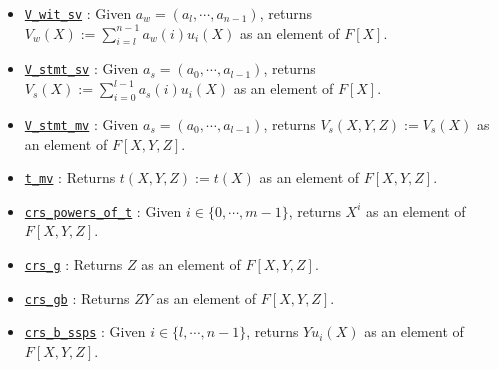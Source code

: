 \documentclass{article}
\theoremstyle{definition}
\theoremstyle{remark}
\begin{document}
\begin{itemize}
  \item \href{https://github.com/BoltonBailey/formal-snarks-project/blob/7fd9cd122f5887f88f6a706b4f2a68a7153c7381/src/snarks/babysnark/knowledge_soundness.lean#L120}{\texttt{V\_wit\_sv}} : Given $a_w = (a_l, \cdots, a_{n - 1})$, returns $V_w(X) := \sum_{i = l}^{n - 1} a_w (i) u_i (X)$ as an element of $F[X]$.
  \item \href{https://github.com/BoltonBailey/formal-snarks-project/blob/7fd9cd122f5887f88f6a706b4f2a68a7153c7381/src/snarks/babysnark/knowledge_soundness.lean#L124}{\texttt{V\_stmt\_sv}} : Given $a_s = (a_0, \cdots, a_{l - 1})$, returns $V_s(X) := \sum_{i = 0}^{l - 1} a_s (i) u_i (X)$ as an element of $F[X]$.
  \item \href{https://github.com/BoltonBailey/formal-snarks-project/blob/7fd9cd122f5887f88f6a706b4f2a68a7153c7381/src/snarks/babysnark/knowledge_soundness.lean#L153}{\texttt{V\_stmt\_mv}} : Given $a_s = (a_0, \cdots, a_{l - 1})$, returns $V_s(X, Y, Z) := V_s(X)$ as an element of $F[X, Y, Z]$.
  \item \href{https://github.com/BoltonBailey/formal-snarks-project/blob/7fd9cd122f5887f88f6a706b4f2a68a7153c7381/src/snarks/babysnark/knowledge_soundness.lean#L150}{\texttt{t\_mv}} : Returns $t(X, Y, Z) := t(X)$ as an element of $F[X, Y, Z]$.
  \item \href{https://github.com/BoltonBailey/formal-snarks-project/blob/7fd9cd122f5887f88f6a706b4f2a68a7153c7381/src/snarks/babysnark/knowledge_soundness.lean#L166}{\texttt{crs\_powers\_of\_t}} : Given $i \in \{ 0, \cdots, m - 1 \}$, returns $X^i$ as an element of $F[X, Y, Z]$.
  \item \href{https://github.com/BoltonBailey/formal-snarks-project/blob/7fd9cd122f5887f88f6a706b4f2a68a7153c7381/src/snarks/babysnark/knowledge_soundness.lean#L167}{\texttt{crs\_g}} : Returns $Z$ as an element of $F[X, Y, Z]$.
  \item \href{https://github.com/BoltonBailey/formal-snarks-project/blob/7fd9cd122f5887f88f6a706b4f2a68a7153c7381/src/snarks/babysnark/knowledge_soundness.lean#L168}{\texttt{crs\_gb}} : Returns $Z Y$ as an element of $F[X, Y, Z]$.
  \item \href{https://github.com/BoltonBailey/formal-snarks-project/blob/7fd9cd122f5887f88f6a706b4f2a68a7153c7381/src/snarks/babysnark/knowledge_soundness.lean#L169}{\texttt{crs\_b\_ssps}} : Given $i \in \{ l, \cdots, n - 1 \}$, returns $Y u_i(X)$ as an element of $F[X, Y, Z]$.
\end{itemize}
\end{document}
